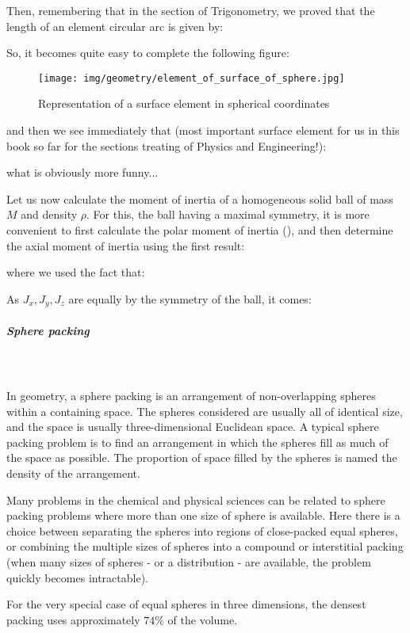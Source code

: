 {	Then, remembering that in the section of Trigonometry, we proved that the length of an element circular arc is given by:
	
	So, it becomes quite easy to complete the following figure:
	\begin{figure}[H]
		\centering
		\texttt{[image: img/geometry/element\_of\_surface\_of\_sphere.jpg]}
		\caption{Representation of a surface element in spherical coordinates}
	\end{figure}
	and then we see immediately that (most important surface element for us in this book so far for the sections treating of Physics and Engineering!)\label{infinitesimal element of a surface of a sphere}:
	
	what is obviously more funny...

	Let us now calculate the moment of inertia of a homogeneous solid ball of mass $M$ and density $\rho$. For this, the ball having a maximal symmetry, it is more convenient to first calculate the polar moment of inertia (), and then determine the axial moment of inertia using the first result:
	
	where we used the fact that:
	
	As $J_x,J_y,J_z$ are equally by the symmetry of the ball, it comes\label{inertia momentum ball}:
	
	
	\subparagraph{Sphere packing}\mbox{}\\\\
	In geometry, a sphere packing is an arrangement of non-overlapping spheres within a containing space. The spheres considered are usually all of identical size, and the space is usually three-dimensional Euclidean space. A typical sphere packing problem is to find an arrangement in which the spheres fill as much of the space as possible. The proportion of space filled by the spheres is named the density of the arrangement. 
	
	Many problems in the chemical and physical sciences can be related to sphere packing problems where more than one size of sphere is available. Here there is a choice between separating the spheres into regions of close-packed equal spheres, or combining the multiple sizes of spheres into a compound or interstitial packing (when many sizes of spheres - or a distribution - are available, the problem quickly becomes intractable).
	
	For the very special case of equal spheres in three dimensions, the densest packing uses approximately $74\%$ of the volume. 
	
}

